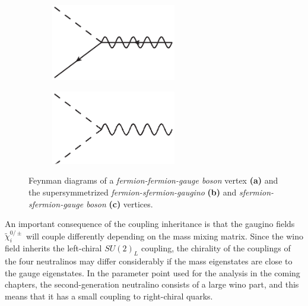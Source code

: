 \documentclass[twoside,english]{uiofysmaster}
\begin{document}
\begin{figure}[htbp]
	\begin{subfigure}[b]{0.45\textwidth}
		\centering
		\includegraphics[width=0.6\textwidth]{figures/susyintro/sfg_vertex.eps}
		\caption{ }
		\label{fig:feynmandiagram_supersymmetrization_b}
	\end{subfigure}
	\begin{subfigure}[b]{0.45\textwidth}
		\centering
		\includegraphics[width=0.6\textwidth]{figures/susyintro/ssg_vertex.eps}
		\caption{ }
		\label{fig:feynmandiagram_supersymmetrization_c}
	\end{subfigure}
	\caption{Feynman diagrams of a {\it fermion-fermion-gauge boson} vertex {\bf (a)} and the supersymmetrized {\it fermion-sfermion-gaugino} {\bf (b)} and {\it sfermion-sfermion-gauge boson} {\bf (c)} vertices.}
	\label{fig:feynmandiagram_supersymmetrization}
\end{figure}

An important consequence of the coupling inheritance is that the gaugino fields $\tilde\chi_i^{0/\pm}$ will couple differently depending on the mass mixing matrix. Since the wino field inherits the left-chiral $SU(2)_L$ coupling, the chirality of the couplings of the four neutralinos may differ considerably if the mass eigenstates are close to the gauge eigenstates. In the parameter point used for the analysis in the coming chapters, the second-generation neutralino consists of a large wino part, and this means that it has a small coupling to right-chiral quarks. 
\end{document}
